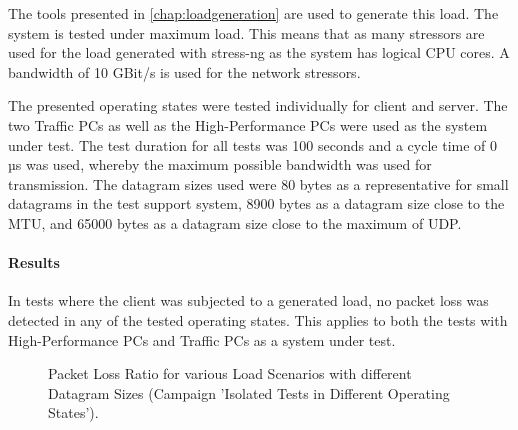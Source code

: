 The tools presented in \ref{chap:loadgeneration} are used to generate this load. The system is tested under maximum load. This means that as many stressors are used for the load generated with stress-ng as the system has logical CPU cores. A bandwidth of 10 GBit/s is used for the network stressors.

The presented operating states were tested individually for client and server. The two Traffic PCs as well as the High-Performance PCs were used as the system under test. The test duration for all tests was 100 seconds and a cycle time of 0 µs was used, whereby the maximum possible bandwidth was used for transmission. The datagram sizes used were 80 bytes as a representative for small datagrams in the test support system, 8900 bytes as a datagram size close to the MTU, and 65000 bytes as a datagram size close to the maximum of UDP.

\paragraph{Results}
In tests where the client was subjected to a generated load, no packet loss was detected in any of the tested operating states. This applies to both the tests with High-Performance PCs and Traffic PCs as a system under test.

\begin{figure}[h!]
  \centering
  \caption{Packet Loss Ratio for various Load Scenarios with different Datagram Sizes (Campaign 'Isolated Tests in Different Operating States').}
  \label{fig:resuc1}
\end{figure}

